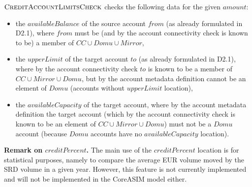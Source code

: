 $\hbox{\sc CreditAccountLimitsCheck}$ checks the following data for the given $amount$:
\begin{itemize}
	\item the $availableBalance$ of the source account $from$ (as already formulated in D2.1), where $from$ must be (and by the account connectivity check is known to be) a member of $CC \cup Domu \cup Mirror$,
	
	\item the $upperLimit$ of the target account $to$ (as already formulated in D2.1), where by the account connectivity check $to$ is known to be a member of $CC \cup  Mirror \cup Domu$, but by the account metadata definition cannot be an element of $Domu$ (accounts without $upperLimit$ location), 
	 
	 \item the $availableCapacity$ of the target account, where by the account metadata definition the target account (which by the account connectivity check is known to be an element of $CC \cup Mirror \cup Domu$) must not be a $Domu$ account (because $Domu$ accounts have no $availableCapacity$ location).
 \end{itemize} 

{\bf Remark on $creditPercent$.} The main use of the $creditPercent$ location is for statistical purposes, namely to compare the average EUR volume moved by the SRD volume in a given year. However, this feature is not currently implemented and will not be implemented in the CoreASIM model either.


